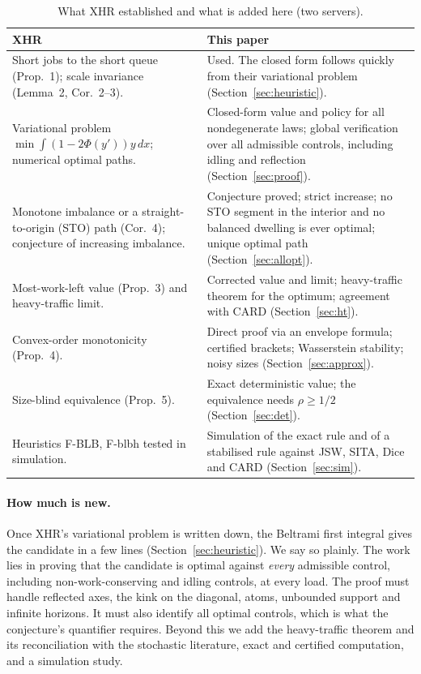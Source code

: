 \documentclass[11pt]{article}
\numberwithin{equation}{section}
\theoremstyle{definition}
\theoremstyle{remark}
\begin{document}
\begin{table}[t]
\centering\small
\caption{What XHR established and what is added here (two servers).}\label{tab:xhr}
\begin{tabular}{@{}p{}p{}@{}}
\toprule
XHR \cite{XHR2026} & This paper\\
\midrule
Short jobs to the short queue (Prop.~1); scale invariance (Lemma~2, Cor.~2--3). & Used. The closed form follows quickly from their variational problem (Section~\ref{sec:heuristic}).\\
Variational problem $\min\int(1-2\Phi(y'))y\,dx$; numerical optimal paths. & Closed-form value and policy for all nondegenerate laws; global verification over all admissible controls, including idling and reflection (Section~\ref{sec:proof}).\\
Monotone imbalance or a straight-to-origin (STO) path (Cor.~4); conjecture of increasing imbalance. & Conjecture proved; strict increase; no STO segment in the interior and no balanced dwelling is ever optimal; unique optimal path (Section~\ref{sec:allopt}).\\
Most-work-left value (Prop.~3) and heavy-traffic limit. & Corrected value and limit; heavy-traffic theorem for the optimum; agreement with CARD (Section~\ref{sec:ht}).\\
Convex-order monotonicity (Prop.~4). & Direct proof via an envelope formula; certified brackets; Wasserstein stability; noisy sizes (Section~\ref{sec:approx}).\\
Size-blind equivalence (Prop.~5). & Exact deterministic value; the equivalence needs $\rho\ge1/2$ (Section~\ref{sec:det}).\\
Heuristics F-BLB, F-blbh tested in simulation. & Simulation of the exact rule and of a stabilised rule against JSW, SITA, Dice and CARD (Section~\ref{sec:sim}).\\
\bottomrule
\end{tabular}
\end{table}

\paragraph{How much is new.} Once XHR's variational problem is written down, the Beltrami first integral gives the candidate in a few lines (Section~\ref{sec:heuristic}). We say so plainly. The work lies in proving that the candidate is optimal against \emph{every} admissible control, including non-work-conserving and idling controls, at every load. The proof must handle reflected axes, the kink on the diagonal, atoms, unbounded support and infinite horizons. It must also identify all optimal controls, which is what the conjecture's quantifier requires. Beyond this we add the heavy-traffic theorem and its reconciliation with the stochastic literature, exact and certified computation, and a simulation study.
\end{document}
